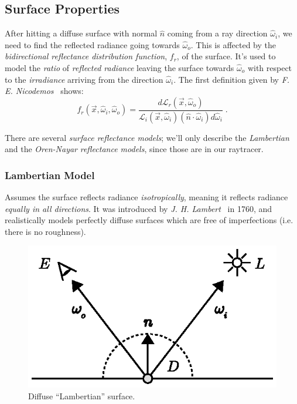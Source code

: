 \documentclass[a4paper, twocolumn]{article}
\begin{document}
    \clearpage

        \subsection{Surface Properties} \label{sec:surface_properties}

            After hitting a diffuse surface with normal \(\hat{n}\) coming from a ray direction \(\hat{\omega}_i\), we need to find the reflected radiance going towards \(\hat{\omega}_o\). This is affected by the \emph{bidirectional reflectance distribution function}, \(f_r\), of the surface. It's used to model the \emph{ratio} of \emph{reflected radiance} leaving the surface towards \(\hat{\omega}_o\) with respect to the \emph{irradiance} arriving from the direction \(\hat{\omega}_i\). The first definition given by \emph{F. E. Nicodemos}~\cite{nicodemus1965directional} shows: \[f_r(\vec{x}, \hat{\omega}_i, \hat{\omega}_o) = \frac{d \mathcal{L}_{r}(\vec{x}, \hat{\omega}_o)}{\mathcal{L}_i(\vec{x}, \hat{\omega}_i)(\hat{n} \cdot \hat{\omega}_i)d\hat{\omega}_i}\; .\]

            There are several \emph{surface reflectance models}; we'll only describe the \emph{Lambertian} and the \emph{Oren-Nayar} \emph{reflectance models}, since those are in our raytracer.

            \subsubsection{Lambertian Model} \label{sec:lambertian_model}

                Assumes the surface reflects radiance \emph{isotropically}, meaning it reflects radiance \emph{equally in all directions}. It was introduced by \emph{J. H. Lambert}~\cite{lambert1760photometria} in 1760, and realistically models perfectly diffuse surfaces which are free of imperfections (i.e. there is no roughness).

                \begin{figure}[ht]
                    \centering
                    \includegraphics[width=0.8\linewidth]{share/lambertian_model.eps}
                    \caption{Diffuse ``Lambertian'' surface.}
                    \label{fig:lambertian_model}
                \end{figure}
\end{document}
